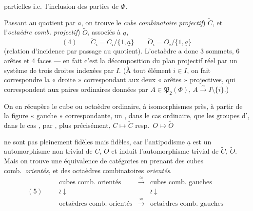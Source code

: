 \documentclass[11pt,a4paper]{article}
\begin{document}
partielles i.e.\ l'inclusion des parties de $\Phi$.

Passant au quotient par $\underline{a}$, on trouve le \emph{cube combinatoire}  \emph{projectif}) $\widetilde{C}$, et l'\emph{octaèdre comb.}  \emph{projectif}) $\widetilde{O}$, associés à $\underline{a}$,
\[
(4) \qquad \widetilde{C}_i = C_i/\lbrace 1, \underline{a} \rbrace
\qquad \widetilde{O}_i = O_i/\lbrace 1, \underline{a} \rbrace
\]
(relation d'incidence  par passage au quotient). L'octaèdre   a donc $3$ sommets, $6$ arêtes et $4$ faces --- en fait c'est la décomposition du plan projectif réel par un système de trois droites indexées par $I$. (À tout élément $i \in I$, on fait correspondre la « droite » correspondant aux deux « arêtes » projectives, qui correspondent aux paires  ordinaires données par $A \in \mathfrak{P}_2(\Phi)$, $A \xrightarrow{\sim} I \setminus \lbrace i \rbrace$.)

On en récupère le cube ou octaèdre ordinaire, à isomorphismes  près, à partir de la figure « gauche »  correspondante, un \ill{} \ill{}, dans le cas ordinaire, \ill{} que les groupes d', dans le cas  , \ill{} \ill{} par \ill{}, plus précisément, $C \mapsto \widetilde{C}$ resp.\ $O \mapsto \widetilde{O}$

ne sont pas pleinement fidèles mais  fidèles, car l'antipodisme $\underline{a}$ est un automorphisme non trivial de $C$, $O$ et induit l'automorphisme trivial de $\widetilde{C}$, $\widetilde{O}$. Mais on trouve une équivalence de catégories en prenant des cubes comb.\ \emph{orientés}, et des octaèdres combinatoires \emph{orientés}.
\[
(5) \qquad
\begin{array}{ccc}
\text{cubes comb.\ orientés} & \xrightarrow{\ \approx\ } & \text{cubes comb.\ gauches} \\
\wr\downarrow & & \wr\downarrow \\
\text{octaèdres comb.\ orientés} & \xrightarrow{\ \approx\ } & \text{octaèdres comb.\ gauches}
\end{array}
\]
\end{document}
